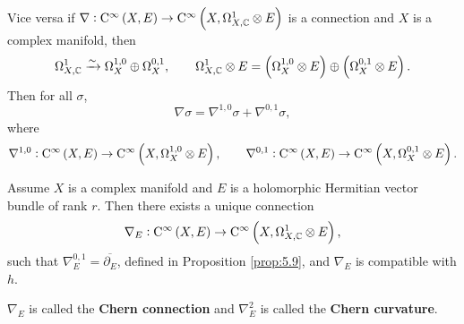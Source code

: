 Vice versa if $ \nabla : \C^\infty\br{X, E} \to \C^\infty\br{X, \Omega_{X, \CC}^1 \otimes E} $ is a connection and $ X $ is a complex manifold, then
$$ \Omega_{X, \CC}^1 \xrightarrow{\sim} \Omega_X^{1, 0} \oplus \Omega_X^{0, 1}, \qquad \Omega_{X, \CC}^1 \otimes E = \br{\Omega_X^{1, 0} \otimes E} \oplus \br{\Omega_X^{0, 1} \otimes E}. $$
Then for all $ \sigma $,
$$ \nabla\sigma = \nabla^{1, 0}\sigma + \nabla^{0, 1}\sigma, $$
where
$$ \nabla^{1, 0} : \C^\infty\br{X, E} \to \C^\infty\br{X, \Omega_X^{1, 0} \otimes E}, \qquad \nabla^{0, 1} : \C^\infty\br{X, E} \to \C^\infty\br{X, \Omega_X^{0, 1} \otimes E}. $$

\begin{theorem}
Assume $ X $ is a complex manifold and $ E $ is a holomorphic Hermitian vector bundle of rank $ r $. Then there exists a unique connection
$$ \nabla_E : \C^\infty\br{X, E} \to \C^\infty\br{X, \Omega_{X, \CC}^1 \otimes E}, $$
such that $ \nabla_E^{0, 1} = \overline{\partial_E} $, defined in Proposition \ref{prop:5.9}, and $ \nabla_E $ is compatible with $ h $.
\end{theorem}

$ \nabla_E $ is called the \textbf{Chern connection} and $ \nabla_E^2 $ is called the \textbf{Chern curvature}.

